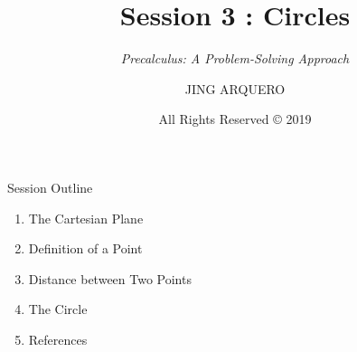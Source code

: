 \documentclass[14pt,aspectratio=169]{beamer}
\begin{document}
\title{Session 3 : Circles}
\subtitle{\textit{Precalculus: A Problem-Solving Approach}}
\author{JING ARQUERO}
\date{All Rights Reserved {\textrm{\copyright}} 2019}

\begin{frame}
 \maketitle
\end{frame}

\begin{frame}{Session Outline}
    \begin{enumerate}
     \item The Cartesian Plane
     \item Definition of a Point
     \item Distance between Two Points
     \item The Circle
     \item References
    \end{enumerate}

\end{frame}
\end{document}
